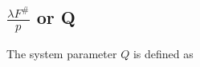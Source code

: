 \documentclass[]{spieman}  %
\begin{document}

\subsection{$\frac{\lambda F^\#}{p}$ or Q}
\label{sec:q}

The system parameter $Q$ is defined as \cite{fiete_q}
\end{document}
